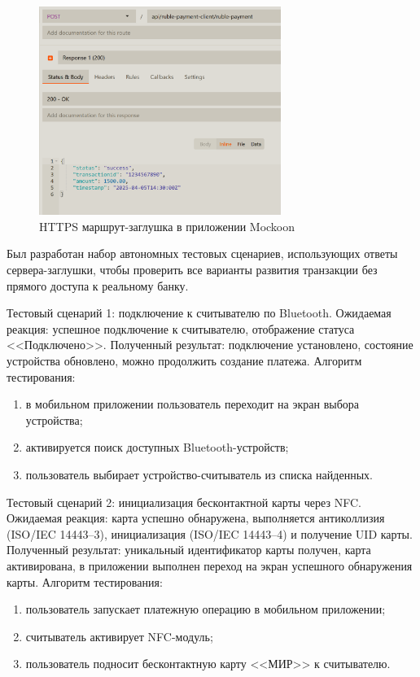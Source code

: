 \begin{figure}[h]
	\centering
	\includegraphics[width=0.7\textwidth]{images/technological/mockoon}
	\caption{\centering HTTPS маршрут-заглушка в приложении Mockoon}
	\label{fig:mockoon}
\end{figure}


Был разработан набор автономных тестовых сценариев, использующих ответы сервера-заглушки, чтобы проверить все варианты развития транзакции без прямого доступа к реальному банку.

Тестовый сценарий 1: подключение к считывателю по Bluetooth.
Ожидаемая реакция: успешное подключение к считывателю, отображение статуса <<Подключено>>.
Полученный результат: подключение установлено, состояние устройства обновлено, можно продолжить создание платежа.
Алгоритм тестирования:
\begin{enumerate}
	\item в мобильном приложении пользователь переходит на экран выбора устройства;
	\item активируется поиск доступных Bluetooth-устройств;
	\item пользователь выбирает устройство-считыватель из списка найденных.
\end{enumerate}

Тестовый сценарий 2: инициализация бесконтактной карты через NFC.
Ожидаемая реакция: карта успешно обнаружена, выполняется антиколлизия (ISO/IEC 14443--3), инициализация (ISO/IEC 14443--4) и получение UID карты.
Полученный результат: уникальный идентификатор карты получен, карта активирована, в приложении выполнен переход на экран успешного обнаружения карты.
Алгоритм тестирования:
\begin{enumerate}
	\item пользователь запускает платежную операцию в мобильном приложении;
	\item считыватель активирует NFC-модуль;
	\item пользователь подносит бесконтактную карту <<МИР>> к считывателю.
\end{enumerate}

